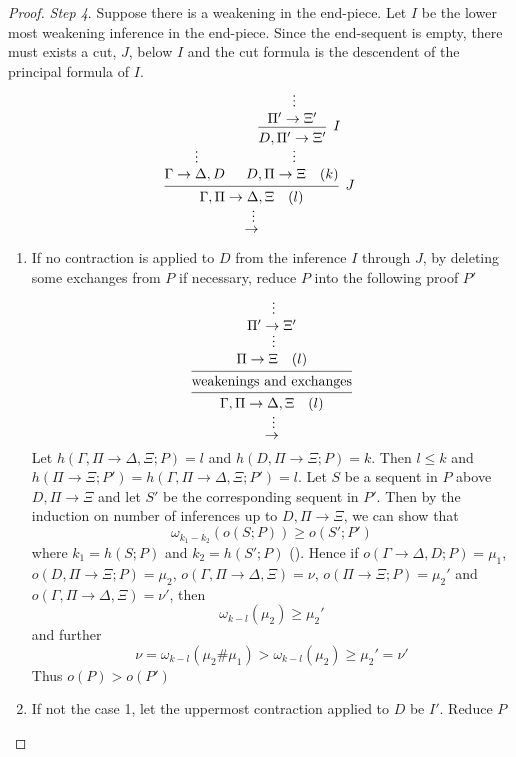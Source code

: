 \documentclass[11pt]{article}
\begin{document}
\begin{enumerate}
\begin{proof}
\emph{Step 4}. Suppose there is a weakening in the end-piece. Let \(I\) be the lower most weakening
inference in the end-piece. Since the end-sequent is empty, there must exists a cut, \(J\),
below \(I\) and the cut formula is the descendent of the principal formula of \(I\).
  \begin{equation*}
\begin{prooftree}%
\hypo{}
\ellipsis{}{\Gamma \to \Delta,D}
\hypo{}
\ellipsis{}{\Pi' \to \Xi'}
\infer1[\(I\)]{D,\Pi'\to\Xi'}
\ellipsis{}{D,\Pi\to\Xi\quad(k)}
\infer2[\(J\)]{\Gamma,\Pi\to\Delta,\Xi \quad(l)}
\ellipsis{}{\to}
\end{prooftree}
  \end{equation*}
\begin{enumerate}
\item If no contraction is applied to \(D\) from the inference \(I\)  through \(J\), by deleting
some exchanges from \(P\) if necessary, reduce \(P\) into the following proof \(P'\)
\begin{equation*}
\begin{prooftree}%
\hypo{}
\ellipsis{}{\Pi'\to\Xi'}
\ellipsis{}{\Pi \to \Xi \quad(l)}
\infer1[]{\text{weakenings and exchanges}}
\infer1{\Gamma,\Pi \to \Delta,\Xi \quad(l)}
\ellipsis{}{\to}
\end{prooftree}
\end{equation*}
Let \(h(\Gamma,\Pi \to \Delta,\Xi;P)=l\) and \(h(D,\Pi \to \Xi;P)=k\). Then \(l\le k\)
and \(h(\Pi\to\Xi;P')=h(\Gamma,\Pi\to\Delta,\Xi;P')=l\). Let \(S\) be a sequent in \(P\)
above \(D,\Pi\to\Xi\) and let \(S'\) be the corresponding sequent in \(P'\). Then by the
induction on number of inferences up to \(D,\Pi\to\Xi\), we can show that
\begin{equation*}
\omega_{k_1-k_2}(o(S;P))\ge o(S';P')
\end{equation*}
where \(k_1=h(S;P)\) and \(k_2=h(S';P)\) (\label{Problem4}). Hence if \(o(\Gamma \to \Delta,D;P)=\mu_1\),
\(o(D,\Pi\to\Xi;P)=\mu_2\), \(o(\Gamma,\Pi\to\Delta,\Xi)=\nu\), \(o(\Pi\to\Xi;P)=\mu_2'\)
and \(o(\Gamma,\Pi\to\Delta,\Xi)=\nu'\), then
\begin{equation*}
\omega_{k-l}(\mu_2)\ge\mu_2'
\end{equation*}
and further
\begin{equation*}
\nu=\omega_{k-l}(\mu_2\#\mu_1)>\omega_{k-l}(\mu_2)\ge\mu_2'=\nu'
\end{equation*}
Thus \(o(P)>o(P')\)
\item If not the case 1, let the uppermost contraction applied to \(D\) be \(I'\). Reduce \(P\)

\end{enumerate}
\end{proof}
\end{enumerate}
\end{document}
